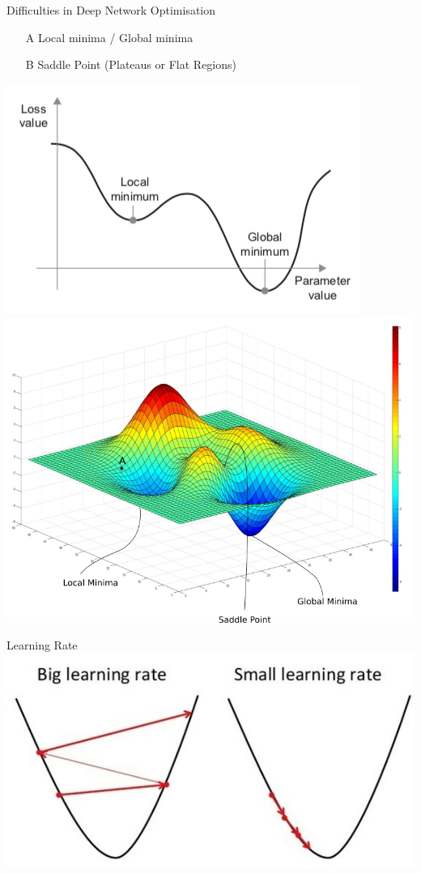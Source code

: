 \documentclass[xcolor=pdftex,dvipsnames,table,mathserif]{beamer}
\begin{document}
\begin{frame}{Difficulties in Deep Network Optimisation}
\begin{itemize}
\item[A]{Local minima / Global minima}
\item[B]{Saddle Point (Plateaus or Flat Regions)}
\end{itemize}
\includegraphics[width=.45\columnwidth]{../graphics/LocalGlobalMinimum}
\includegraphics[width=.45\columnwidth]{../graphics/challenges1} \\

\end{frame}




\begin{frame}{Learning Rate}
\includegraphics[width=.95\columnwidth]{../graphics/BigLearningRate}
\end{frame}
\end{document}
